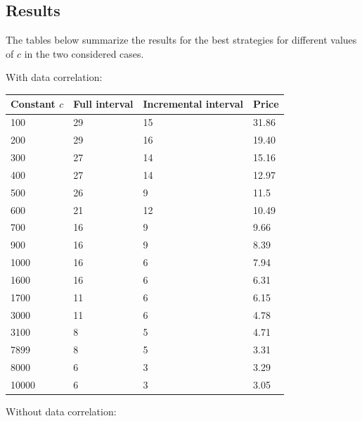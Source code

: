 \documentclass[11pt, a4paper]{article}
\theoremstyle{definition}
\begin{document}
\subsection{Results}
The tables below summarize the results for the best strategies for different values of $c$ in the two considered cases.\par
With data correlation:
\begin{center}\label{table_corr}
	\begin{tabular}{| l | l | l | l |}
		\hline
		Constant $c$ & Full interval & Incremental interval & Price\\ \hline
		100 & 29 & 15 & 31.86\\ \hline
		200 & 29 & 16 & 19.40\\ \hline
		300 & 27 & 14 & 15.16\\ \hline
		400 & 27 & 14 & 12.97\\ \hline
		500 & 26 & 9 & 11.5\\ \hline
		600 & 21 & 12 & 10.49\\ \hline
		700 & 16 & 9 & 9.66\\ \hline
		900 & 16 & 9 & 8.39\\ \hline
		1000 & 16 & 6 & 7.94\\ \hline
		1600 & 16 & 6 & 6.31\\ \hline
		1700 & 11 & 6 & 6.15\\ \hline
		3000 & 11 & 6 & 4.78\\ \hline
		3100 & 8 & 5 & 4.71\\ \hline
		7899 & 8 & 5 & 3.31\\ \hline
		8000 & 6 & 3 & 3.29\\ \hline
		10000 & 6 & 3 & 3.05\\ \hline
	\end{tabular}
\end{center}
Without data correlation:
\end{document}
